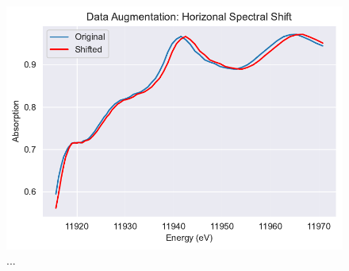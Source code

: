 \begin{figure}
    \centering
    \includegraphics[width=\linewidth]{Chapters/Figures/data-aug-shift-pt75wieght.pdf}
    \caption[Data Augmentation: Horizontal Shift]{...}
    \label{fig:data-aug-hor}
\end{figure}


